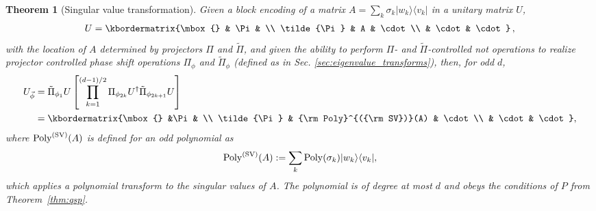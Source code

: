 \documentclass[aps,pra,showpacs,notitlepage,twocolumn,superscriptaddress,nofootinbib]{revtex4-1}
\newtheorem{theorem}{Theorem}
\def\>{\rangle}
\def\<{\langle}
\newcommand{\bea}{\begin{eqnarray}}
\newcommand{\eea}{\end{eqnarray}}
\newcommand{\be}{\begin{equation}}
\newcommand{\ee}{\end{equation}}
\begin{document}
    \begin{theorem}[Singular value transformation]\label{thm:singular_value_transform}
        Given a block encoding of a matrix $A = \sum_k \sigma_k |w_k\>\<v_k|$ in a unitary matrix $U$,
            \bea
                U = \kbordermatrix{\mbox{} & \Pi &  \\
                  \tilde{\Pi} & A     & \cdot \\ 
                              & \cdot & \cdot 
                }
                \,,
            \eea
        with the location of $A$ determined by projectors $\Pi$ and $\tilde\Pi$, and given the ability to perform $\Pi$- and $\tilde\Pi$-controlled {\sc not} operations to realize projector controlled phase shift operations $\Pi_\phi$ and  $\tilde{\Pi}_\phi$ (defined as in Sec. \ref{sec:eigenvalue_transforms}), then, for odd $d$,
            \begin{align}\label{eq:thm_singular_value_transform_d_odd}
                \begin{aligned}
                      U_{\vec\phi} &= \tilde{\Pi}_{\phi_{1}}  U \left[ \prod_{k=1}^{(d-1)/2} \Pi_{\phi_{2k}} U^\dagger \tilde{\Pi}_{\phi_{2k+1}}  U  \right] \\ &= 
              \kbordermatrix{\mbox{} &\Pi &  \\
                \tilde{\Pi} & {\rm Poly}^{({\rm SV})}(A)     & \cdot \\ 
                    & \cdot & \cdot 
              },
                \end{aligned}
            \end{align}
        where $ {\rm Poly}^{({\rm SV})}(A)$ is defined for an odd polynomial as
        \be
            {\rm Poly}^{({\rm SV})}(A) := \sum_{k} {\rm Poly}(\sigma_k) |w_k\>\<v_k|,
        \ee
        which applies a polynomial transform to the singular values of $A$.  The polynomial is of degree at most $d$ and obeys the conditions of $P$ from Theorem~\ref{thm:qsp}.
            

\end{theorem}
\end{document}
